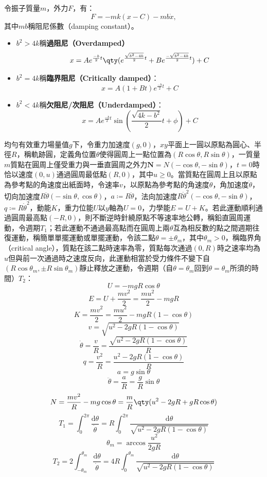 \documentclass[a4paper,12pt]{article}
\begin{document}
令振子質量$m$，外力$F$，有：
\[F=-mk(x-C)-mb\dot{x},\]
其中$mb$稱阻尼係數（damping constant）。
\begin{itemize}
\item $b^2>4k$稱\textbf{過阻尼（Overdamped）}
\[x=Ae^{\frac{-b}{2}t}\qty(e^{\frac{\sqrt{b^2-4k}}{2}t}+Be^{\frac{-\sqrt{b^2-4k}}{2}t})+C\]
\item $b^2=4k$稱\textbf{臨界阻尼（Critically damped）}：
\[x=A(1+Bt)e^{\frac{-b}{2}t}+C\]
\item $b^2<4k$稱\textbf{欠阻尼/次阻尼（Underdamped）}：
\[x=Ae^{\frac{-b}{2}t}\sin(\frac{\sqrt{4k-b^2}}{2}t+\phi)+C\]
\end{itemize}
均勻有效重力場量值$g$下，令重力加速度$(g,0)$，$xy$平面上一圓以原點為圓心、半徑$R$，稱軌跡圓，定義角位置$\theta$使得圓周上一點位置為$(R\cos\theta,R\sin\theta)$，一質量$m$質點在圓周上僅受重力與一垂直圓周之外力$\mathbf{N}=N(-\cos\theta,-\sin\theta)$，$t=0$時恰以速度$(0,u)$通過圓周最低點$(R,0)$，其中$u\geq 0$。當質點在圓周上且以原點為參考點的角速度出紙面時，令速率$v$，以原點為參考點的角速度$\dot{\theta}$，角加速度$\ddot{\theta}$，切向加速度$R\ddot{\theta}(-\sin\theta,\cos\theta)$，$a\coloneq R\ddot{\theta}$，法向加速度$R\dot{\theta}^2(-\cos\theta,-\sin\theta)$，$q\coloneq R\dot{\theta}^2$，動能$K$，重力位能$U$以$y$軸為$U=0$，力學能$E=U+K$。若此運動順利通過圓周最高點$(-R,0)$，則不斷逆時針繞原點不等速率地公轉，稱鉛直圓周運動，令週期$T_1$；若此運動不通過最高點而在圓周上兩$\theta$互為相反數的點之間週期往復運動，稱簡單單擺運動或單擺運動，令該二點$\theta=\pm\theta_m$，其中$\theta_m>0$，稱臨界角（critical angle），質點在該二點時速率為零，質點每次通過$(0,R)$時之速率均為$u$但與前一次通過時之速度反向，此運動相當於受力條件不變下自$(R\cos\theta_m,\pm R\sin\theta_m)$靜止釋放之運動，令週期（自$\theta=\theta_m$回到$\theta=\theta_m$所須的時間）$T_2$：
\[U=-mgR\cos\theta\]
\[E=U+\frac{mv^2}{2}=\frac{mu^2}{2}-mgR\]
\[K=\frac{mv^2}{2}=\frac{mu^2}{2}-mgR(1-\cos\theta)\]
\[v=\sqrt{u^2-2gR(1-\cos\theta)}\]
\[\dot{\theta}=\frac{v}{R}=\frac{\sqrt{u^2-2gR(1-\cos\theta)}}{R}\]
\[q=\frac{v^2}{R}=\frac{u^2-2gR(1-\cos\theta)}{R}\]
\[a=g\sin\theta\]
\[\ddot{\theta}=\frac{a}{R}=\frac{g}{R}\sin\theta\]
\[N=\frac{mv^2}{R}-mg\cos\theta=\frac{m}{R}\qty(u^2-2gR+gR\cos\theta)\]
\[T_1=\int_0^{2\pi}\frac{\mathrm{d}\theta}{\dot{\theta}}=R\int_0^{2\pi}\frac{\mathrm{d}\theta}{\sqrt{u^2-2gR(1-\cos\theta)}}\]
\[\theta_m=\arccos\frac{u^2}{2gR}\]
\[T_2=2\int_{-\theta_m}^{\theta_m}\frac{\mathrm{d}\theta}{\dot{\theta}}=4R\int_0^{\theta_m}\frac{\mathrm{d}\theta}{\sqrt{u^2-2gR(1-\cos\theta)}}\]
\end{document}
